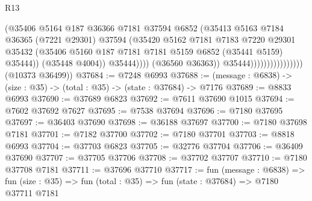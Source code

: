 \begin{lexlean}{R13}
\begin{coremodule}
                                              (@35406
                                                @5164
                                                @187
                                                @36366
                                                @7181
                                                @37594
                                                @6852
                                                (@35413
                                                  @5163
                                                  @7184
                                                  @36365
                                                  (@7221 @29301)
                                                  @37594
                                                  (@35420
                                                    @5162
                                                    @7181
                                                    @7183
                                                    @7220
                                                    @29301
                                                    @35432
                                                    (@35406
                                                      @5160
                                                      @187
                                                      @7181
                                                      @7181
                                                      @5159
                                                      @6852
                                                      (@35441 @5159)
                                                      @35444))
                                                  (@35448 @4004))
                                                @35444))))
                                        (@36560 @36363))
                                      @35444))))))))))))))))
      (@10373 @36499))
@37684 := @7248 @6993
@37688 := (message : @6838) -> (size : @35) -> (total : @35) -> (state : @37684) -> @7176
@37689 := @8833 @6993
@37690 := @37689 @6823
@37692 := @7611 @37690 @1015
@37694 := @7602 @37692 @7627
@37695 := @7538 @37694
@37696 := @7180 @37695
@37697 := @36403 @37690
@37698 := @36188 @37697
@37700 := @7180 @37698 @7181
@37701 := @7182 @37700
@37702 := @7180 @37701
@37703 := @8818 @6993
@37704 := @37703 @6823
@37705 := @32776 @37704
@37706 := @36409 @37690
@37707 := @37705 @37706
@37708 := @37702 @37707
@37710 := @7180 @37708 @7181
@37711 := @37696 @37710
@37717 := fun (message : @6838) =>
  fun (size : @35) => fun (total : @35) => fun (state : @37684) => @7180 @37711 @7181

\end{coremodule}
\end{lexlean}
